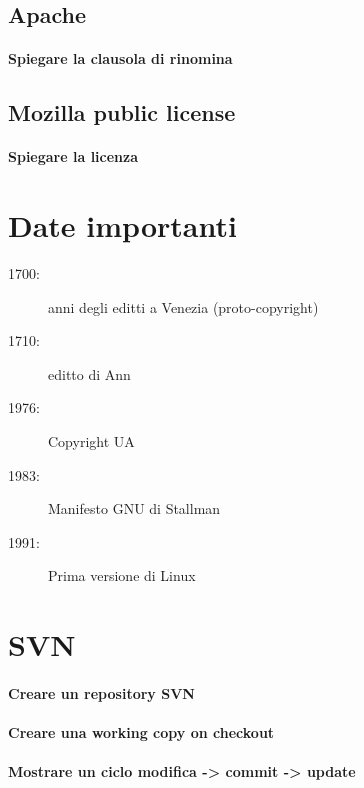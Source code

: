 \documentclass[a4paper]{article}
\begin{document}
		\subsection{Apache}
		
			\paragraph{Spiegare la clausola di rinomina}
			
	
		\subsection{Mozilla public license}
		
			\paragraph{Spiegare la licenza}
		
		
	\section{Date importanti}
	
	\begin{description}
		\item[1700:] anni degli editti a Venezia (proto-copyright)
		\item[1710:] editto di Ann
		\item[1976:] Copyright UA
		\item[1983:] Manifesto GNU di Stallman
		\item[1991:] Prima versione di Linux
	\end{description}
	
	
	\section{SVN}
	
	\paragraph{Creare un repository SVN}
	
	\paragraph{Creare una working copy on checkout}
	
	\paragraph{Mostrare un ciclo modifica -> commit -> update}
	
\end{document}
